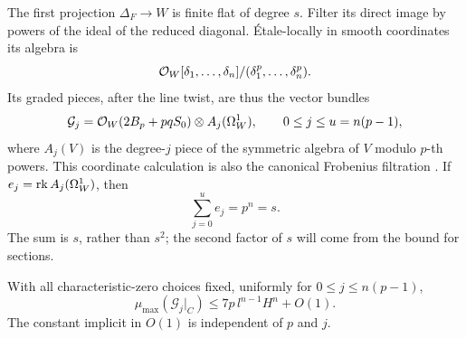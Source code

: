 The first projection \(\Delta_F\to W\) is finite flat of degree \(s\).
Filter its direct image by powers of the ideal of the reduced
diagonal. \'{E}tale-locally in smooth coordinates its algebra is
\[
 \mathcal{O}_W[\delta_1,\ldots,\delta_n]/
                  (\delta_1^p,\ldots,\delta_n^p).
\]
Its graded pieces, after the line twist, are thus the vector bundles
\begin{equation}
\label{proj:fr:graded-pieces}
 \mathcal G_j=
 \mathcal{O}_W(2B_p+pqS_0)\otimes A_j(\Omega_W^1),
 \qquad 0\leq j\leq u=n(p-1),
\end{equation}
where \(A_j(V)\) is the degree-\(j\) piece of the symmetric algebra of
\(V\) modulo \(p\)-th powers. This coordinate calculation is also the
canonical Frobenius filtration
\cite[Theorem~3.7]{Proj-Sun2008}. If \(e_j=\operatorname{rk} A_j(\Omega_W^1)\), then
\begin{equation}
\label{proj:fr:ranks}
 \sum_{j=0}^u e_j=p^n=s.
\end{equation}
The sum is \(s\), rather than \(s^2\); the second factor of \(s\) will
come from the bound for sections.

\begin{lemma}
\label{proj:fr:slope}
With all characteristic-zero choices fixed, uniformly for
\(0\leq j\leq n(p-1)\),
\[
 \mu_{\max}(\mathcal G_j|_C)
     \leq 7p\,l^{n-1}H^n+O(1).
\]
The constant implicit in \(O(1)\) is independent of \(p\) and \(j\).
\end{lemma}

